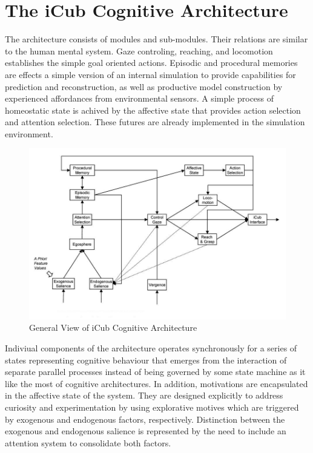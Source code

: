 \documentclass[a4paper, 11pt]{report}
\begin{document}
\section{The iCub Cognitive Architecture}
The architecture consists of modules and sub-modules. Their relations are 
similar to the human mental system. Gaze controling, reaching, and locomotion 
establishes the simple goal oriented actions. Episodic and procedural memories 
are effects a simple version of an internal simulation to provide capabilities 
for prediction and reconstruction, as well as productive model construction 
by experienced affordances from environmental sensors. A simple process of 
homeostatic state is achived by the affective state that provides action 
selection and attention selection. These futures are already implemented in the 
simulation environment.
\begin{figure}[h!]
  \centering
  \includegraphics[width=1.0\linewidth]{cognitive_architecture}
  \caption{General View of iCub Cognitive Architecture}
  \label{fig:cognitive_architecture}
 \end{figure}
Indiviual components of the architecture operates synchronously for a series of 
states representing cognitive behaviour that emerges from the interaction of 
separate parallel processes instead of being governed by some state machine as 
it like the most of cognitive architectures. In addition, motivations are 
encapsulated in the affective state of the system. They are designed explicitly 
to address curiosity and experimentation by using explorative motives which are 
triggered by exogenous and endogenous factors, respectively. Distinction 
between the exogenous and endogenous salience is represented by the need to 
include an attention system to consolidate both factors.
\newpage
\end{document}
